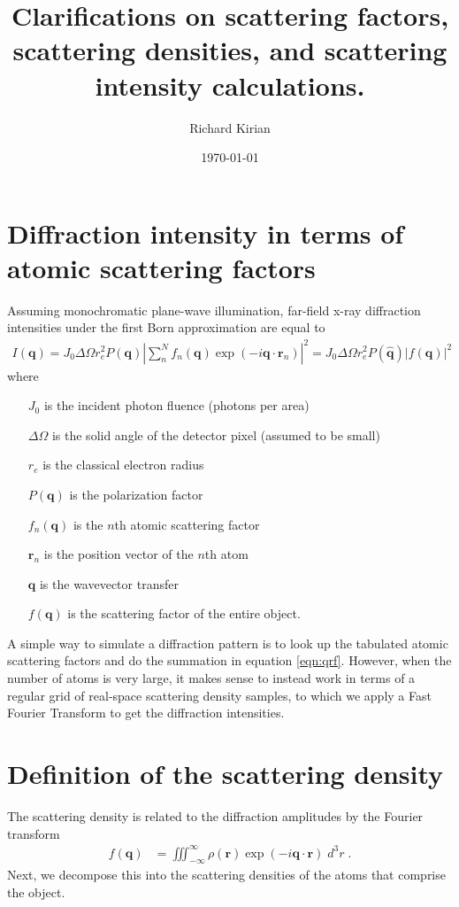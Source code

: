 \documentclass[11pt]{article}
\title{Clarifications on scattering factors, scattering densities, and scattering intensity calculations.}
\author{Richard Kirian}
\date{\today}
\renewcommand{\vec}[1]{\boldsymbol{#1}}
\newcommand{\hvec}[1]{\hat{\vec{#1}}}
\begin{document}
 

\maketitle


\section{Diffraction intensity in terms of atomic scattering factors}

Assuming monochromatic plane-wave illumination, far-field x-ray diffraction 
intensities under the first Born approximation are equal to
\begin{align}\label{eqn:qrf}
I(\vec{q}) = J_0 \Delta \Omega r_e^2 P(\vec{q}) \left| \sum_n^N f_n(\vec{q}) \exp(-i \vec{q}\cdot\vec{r}_n)\right|^2 = 
J_0 \Delta \Omega r_e^2 P(\hvec{q}) \left| f(\vec{q})\right|^2
\end{align}
where 
\begin{itemize}
\item[$J_0$] is the incident photon fluence (photons per area)
\item[$\Delta \Omega$] is the solid angle of the detector pixel (assumed
to be small)
\item[$r_e$] is the classical electron radius
\item[$P(\vec{q})$] is the polarization factor
\item[$f_n(\vec{q})$] is the $n$th atomic scattering factor
\item[$\vec{r}_n$] is the position vector of the $n$th atom
\item[$\vec{q}$] is the wavevector transfer
\item[$f(\vec{q})$] is the scattering factor of the entire object.
\end{itemize}
A simple way to simulate a diffraction pattern is to look up the tabulated atomic
scattering factors and do the summation in equation \ref{eqn:qrf}.  However,
when the number of atoms is very large, it makes sense to instead work in terms
of a regular grid of real-space scattering density samples, to which we apply a 
Fast Fourier Transform to get the diffraction intensities.

\section{Definition of the scattering density}

The scattering density is related to the diffraction amplitudes by the
Fourier transform
\begin{align}
 f(\vec{q})  &=  \iiint_{-\infty}^\infty \rho(\vec{r}) \exp(-i \vec{q}\cdot\vec{r}) \; d^3r\; .
\end{align}
Next, we decompose this into the scattering densities of the atoms that
comprise the object.
\end{document}
